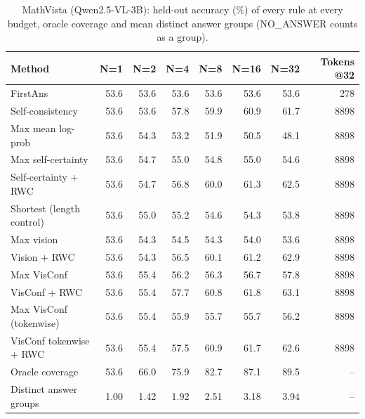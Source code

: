 \begin{table}[t]
\centering
\small
\caption{MathVista (Qwen2.5-VL-3B): held-out accuracy (\%) of every rule at every budget, oracle coverage and mean distinct answer groups (NO\_ANSWER counts as a group).}
\label{tab:t3-curves-mathvista}
\begin{tabular}{lrrrrrrr}
\toprule
Method & N=1 & N=2 & N=4 & N=8 & N=16 & N=32 & Tokens @32 \\
\midrule
FirstAns & 53.6 & 53.6 & 53.6 & 53.6 & 53.6 & 53.6 & 278 \\
Self-consistency & 53.6 & 53.6 & 57.8 & 59.9 & 60.9 & 61.7 & 8898 \\
Max mean log-prob & 53.6 & 54.3 & 53.2 & 51.9 & 50.5 & 48.1 & 8898 \\
Max self-certainty & 53.6 & 54.7 & 55.0 & 54.8 & 55.0 & 54.6 & 8898 \\
Self-certainty + RWC & 53.6 & 54.7 & 56.8 & 60.0 & 61.3 & 62.5 & 8898 \\
Shortest (length control) & 53.6 & 55.0 & 55.2 & 54.6 & 54.3 & 53.8 & 8898 \\
Max vision & 53.6 & 54.3 & 54.5 & 54.3 & 54.0 & 53.6 & 8898 \\
Vision + RWC & 53.6 & 54.3 & 56.5 & 60.1 & 61.2 & 62.9 & 8898 \\
Max VisConf & 53.6 & 55.4 & 56.2 & 56.3 & 56.7 & 57.8 & 8898 \\
VisConf + RWC & 53.6 & 55.4 & 57.7 & 60.8 & 61.8 & 63.1 & 8898 \\
Max VisConf (tokenwise) & 53.6 & 55.4 & 55.9 & 55.7 & 55.7 & 56.2 & 8898 \\
VisConf tokenwise + RWC & 53.6 & 55.4 & 57.5 & 60.9 & 61.7 & 62.6 & 8898 \\
Oracle coverage & 53.6 & 66.0 & 75.9 & 82.7 & 87.1 & 89.5 & – \\
Distinct answer groups & 1.00 & 1.42 & 1.92 & 2.51 & 3.18 & 3.94 & – \\
\bottomrule
\end{tabular}
\end{table}
